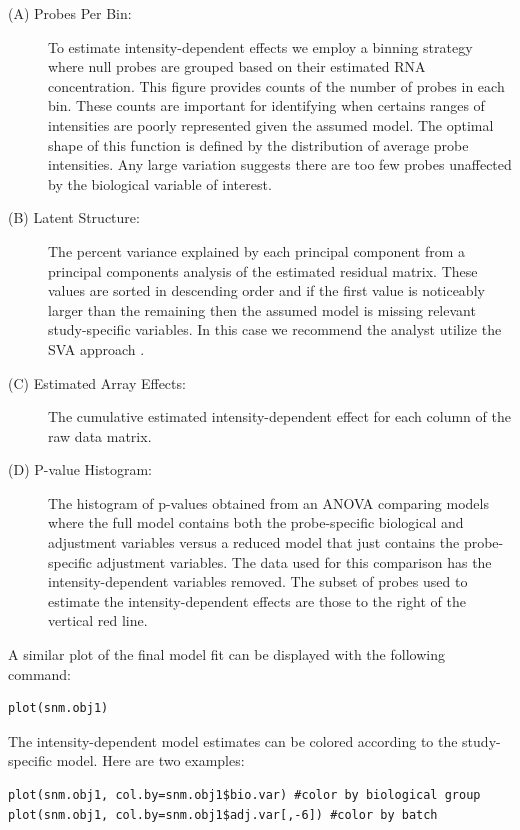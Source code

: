 \documentclass[11pt]{article}
\begin{document}
\begin{description}
  \item[(A) Probes Per Bin:] To estimate intensity-dependent effects we employ a binning strategy where null probes are grouped based on 
  their estimated RNA concentration.  This figure provides counts of the number of probes in each bin.  These counts are important for 
  identifying when certains ranges of intensities are poorly represented given the assumed model.  The optimal shape of this function is 
  defined by the distribution of average probe intensities.  Any large variation suggests there are too few probes unaffected by the 
  biological variable of interest.  
  \item[(B) Latent Structure:] The percent variance explained by each principal component from a principal components analysis of the estimated residual matrix.  These values are sorted in descending order and if the first value is noticeably larger than the remaining then the assumed model is missing relevant study-specific variables.  In this case
  we recommend the analyst utilize the SVA approach \cite{Leek07}.
  \item[(C) Estimated Array Effects: ] The cumulative estimated intensity-dependent effect for each column of the raw data matrix.  
  \item[(D) P-value Histogram:] The histogram of p-values obtained from an ANOVA comparing models where the full model contains both the probe-specific biological and adjustment variables versus a reduced model that just contains the probe-specific adjustment variables.  The data used for this comparison has the intensity-dependent variables removed.  The subset of probes used to estimate the intensity-dependent effects are those to the right of the vertical red line.
\end{description}

A similar plot of the final model fit can be displayed with the following command:

\begin{verbatim}
plot(snm.obj1)
\end{verbatim}

The intensity-dependent model estimates can be colored according to the study-specific model.  Here are two examples:

\begin{verbatim}
plot(snm.obj1, col.by=snm.obj1$bio.var) #color by biological group
plot(snm.obj1, col.by=snm.obj1$adj.var[,-6]) #color by batch
\end{verbatim}
\end{document}
